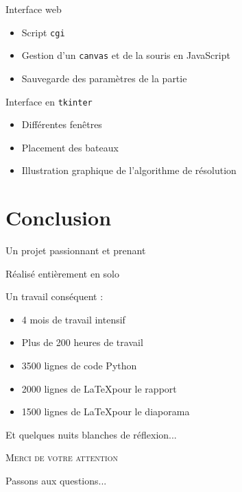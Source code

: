 \begin{frame}{Interface web}
\begin{itemize}
\item Script \texttt{cgi}\pause
\item Gestion d'un \texttt{canvas} et de la souris en JavaScript\pause
\item Sauvegarde des paramètres de la partie
\end{itemize}

\end{frame}

\begin{frame}{Interface en \texttt{tkinter}}
\begin{itemize}
\item Différentes fenêtres\pause
\item Placement des bateaux\pause
\item Illustration graphique de l'algorithme de résolution
\end{itemize}
\end{frame}

\section{Conclusion}
\begin{frame}
Un projet passionnant et prenant\pause

\medskip

Réalisé entièrement en solo\pause

\medskip

Un travail conséquent :\pause

\begin{itemize}
\item 4 mois de travail intensif\\ \pause
\item Plus de 200 heures de travail\\ \pause
\item 3500 lignes de code Python\\ \pause
\item 2000 lignes de \LaTeX pour le rapport\\ \pause
\item 1500  lignes de \LaTeX pour le diaporama\\ \pause
\end{itemize}
Et quelques nuits blanches de réflexion...
\end{frame}

\begin{frame}{}

\begin{center}
\textsc{\Huge Merci de votre attention}

\bigskip
Passons aux questions...


\end{center}
\end{frame}



